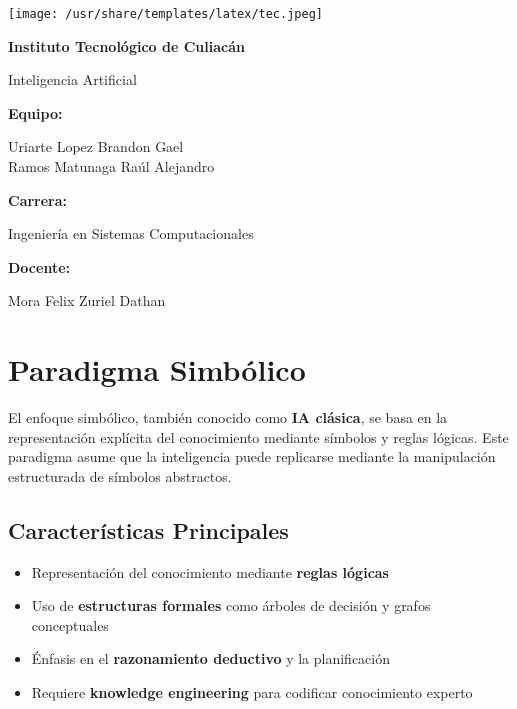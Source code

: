 \documentclass[14pt]{extarticle}
\begin{document}
  
  \thispagestyle{empty}

  \texttt{[image: /usr/share/templates/latex/tec.jpeg]}

  \begin{center}
    {\LARGE \textbf{Instituto Tecnológico de Culiacán}}

    \vspace{1cm}
    {\Large Inteligencia Artificial}

    \vspace{4cm}
    {\large \textbf{Equipo:}}

    \vspace{0.3cm}
    {\large
      Uriarte Lopez Brandon Gael\\\vspace{0.3cm}
      Ramos Matunaga Raúl Alejandro
    }

    \vspace{2cm}
    {\large \textbf{Carrera:}}

    \vspace{0.3cm}
    {\large Ingeniería en Sistemas Computacionales}

    \vspace{2cm}
    {\large \textbf{Docente:}}

    \vspace{0.3cm}
    {\large Mora Felix Zuriel Dathan}
  \end{center}

  \newpage

  \section*{Paradigma Simbólico}

  El enfoque simbólico, también conocido como \textbf{IA clásica}, se basa en la representación explícita del conocimiento mediante símbolos y reglas lógicas. Este paradigma asume que la inteligencia puede replicarse mediante la manipulación estructurada de símbolos abstractos.

  \subsection*{Características Principales}
  \begin{itemize}
      \item Representación del conocimiento mediante \textbf{reglas lógicas}
      \item Uso de \textbf{estructuras formales} como árboles de decisión y grafos conceptuales
      \item Énfasis en el \textbf{razonamiento deductivo} y la planificación
      \item Requiere \textbf{knowledge engineering} para codificar conocimiento experto
  \end{itemize}
\end{document}
